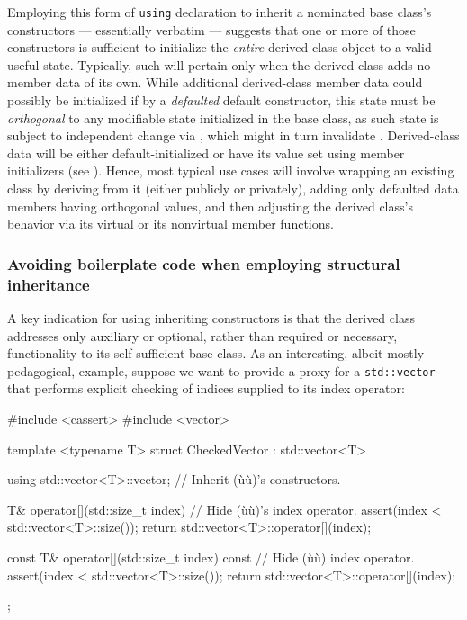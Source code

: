 Employing this form of \lstinline!using! declaration to inherit a nominated
base class's constructors --- essentially verbatim --- suggests that one
or more of those constructors is sufficient to initialize the
\emph{entire} derived-class object to a valid useful state. Typically,
such will pertain only when the derived class adds no member data of its
own. While additional derived-class member data could possibly
be initialized if by a \emph{defaulted} default constructor, this state must be \emph{orthogonal} to
any modifiable state initialized in the base class, as such state is
subject to independent change via , which might in turn
invalidate . Derived-class data will be either default-initialized or have its value set using member
initializers (see ).  
Hence, most typical use cases will involve wrapping an
existing class by deriving from it (either publicly or privately),
adding only defaulted data members having orthogonal values, and then
adjusting the derived class's behavior via  its virtual
or  its nonvirtual member functions.

\subsubsection[Avoiding boilerplate code when employing structural inheritance]{Avoiding boilerplate code when employing structural inheritance}\label{avoiding-boilerplate-code-code-when-employing-structural-inheritance}

A key indication for using inheriting constructors is that the
derived class addresses only auxiliary or optional, rather than required
or necessary, functionality to its self-sufficient base class. As an
interesting, albeit mostly pedagogical, example, suppose we
want to provide a proxy for a \lstinline!std::vector! that performs
explicit checking of indices supplied to its index operator:

\begin{emcppslisting}
#include <cassert>                                                              
#include <vector>

template <typename T>
struct CheckedVector : std::vector<T>
{
    using std::vector<T>::vector;      // Inherit (ù{}ù)'s constructors.

    T& operator[](std::size_t index)   // Hide (ù{}ù)'s index operator.
    {
         assert(index < std::vector<T>::size());
         return std::vector<T>::operator[](index);
    }

    const T& operator[](std::size_t index) const  // Hide (ù{}ù) index operator.
    {
         assert(index < std::vector<T>::size());
         return std::vector<T>::operator[](index);
    }
};
\end{emcppslisting}
    
